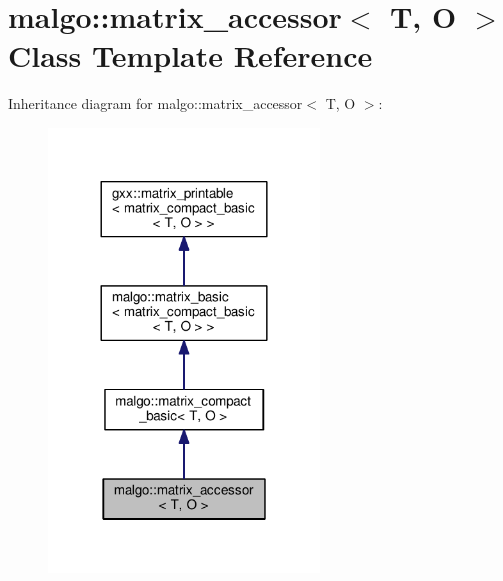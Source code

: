 \hypertarget{classmalgo_1_1matrix__accessor}{}\section{malgo\+:\+:matrix\+\_\+accessor$<$ T, O $>$ Class Template Reference}
\label{classmalgo_1_1matrix__accessor}


Inheritance diagram for malgo\+:\+:matrix\+\_\+accessor$<$ T, O $>$\+:
\nopagebreak
\begin{figure}[H]
\begin{center}
\leavevmode
\includegraphics[width=204pt]{classmalgo_1_1matrix__accessor__inherit__graph}
\end{center}
\end{figure}


